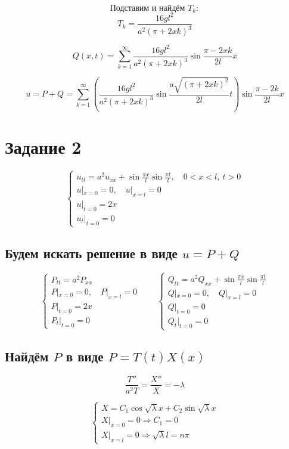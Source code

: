 \documentclass[a4paper,12pt]{article}
\begin{document}
$$\textbf{Подставим и найдём } T_k:$$
$$T_k = \frac{16 g l^2}{a^2 (\pi + 2 x k)^3}$$

$$Q(x, t) = \sum_{k=1}^\infty \frac{16 g l^2}{a^2 (\pi + 2 x k)^3} \sin \frac{\pi - 2 x k}{2 l} x$$

$$u = P + Q = \sum_{k=1}^\infty \left( \frac{16 g l^2}{a^2 (\pi + 2 x k)^3} \sin \frac{a \sqrt{(\pi + 2 x k)^2}}{2 l} t \right) \sin \frac{\pi - 2 k}{2 l} x$$

\section{Задание 2}

$$\begin{cases}
u_{tt} = a^2 u_{xx} + \sin \frac{\pi x}{l} \sin \frac{\pi t}{l}, \quad 0 < x < l,\ t > 0 \\
u|_{x=0} = 0, \quad u|_{x=l} = 0 \\
u|_{t=0} = 2x \\
u_t|_{t=0} = 0
\end{cases}$$

\subsection*{Будем искать решение в виде $u = P + Q$}

$$\begin{cases}
P_{tt} = a^2 P_{xx} \\
P|_{x=0} = 0, \quad P|_{x=l} = 0 \\
P|_{t=0} = 2x \\
P_t|_{t=0} = 0
\end{cases}
\qquad
\begin{cases}
Q_{tt} = a^2 Q_{xx} + \sin \frac{\pi x}{l} \sin \frac{\pi t}{l} \\
Q|_{x=0} = 0, \quad Q|_{x=l} = 0 \\
Q|_{t=0} = 0 \\
Q_t|_{t=0} = 0
\end{cases}$$

\subsection*{Найдём $P$ в виде $P = T(t) X(x)$}

$$\frac{T''}{a^2 T} = \frac{X''}{X} = -\lambda$$

$$\begin{cases}
X = C_1 \cos \sqrt{\lambda} x + C_2 \sin \sqrt{\lambda} x \\
X|_{x=0} = 0 \Rightarrow C_1 = 0 \\
X|_{x=l} = 0 \Rightarrow \sqrt{\lambda} l = n \pi
\end{cases}$$
\end{document}
